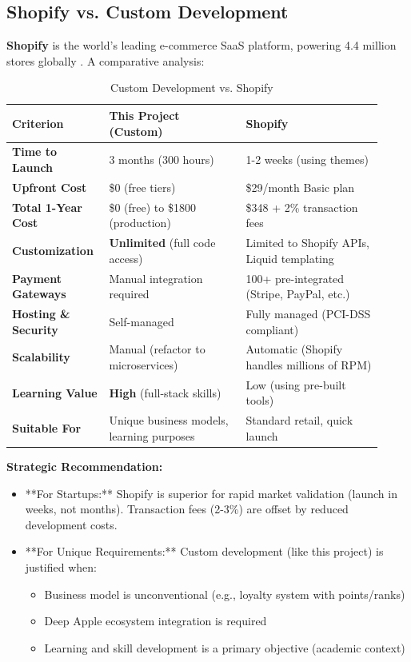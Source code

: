 \documentclass[12pt, a4paper]{report}
\begin{document}
\subsection{Shopify vs. Custom Development}

\textbf{Shopify} is the world's leading e-commerce SaaS platform, powering 4.4 million stores globally \cite{shopify2024}. A comparative analysis:

\begin{table}[H]
\centering
\caption{Custom Development vs. Shopify}
\label{tab:shopify_comparison}
\small
\begin{tabular}{@{}p{0.22\linewidth}p{0.35\linewidth}p{0.35\linewidth}@{}}
\toprule
\textbf{Criterion} & \textbf{This Project (Custom)} & \textbf{Shopify} \\
\midrule
\textbf{Time to Launch} & 3 months (300 hours) & 1-2 weeks (using themes) \\
\textbf{Upfront Cost} & \$0 (free tiers) & \$29/month Basic plan \\
\textbf{Total 1-Year Cost} & \$0 (free) to \$1800 (production) & \$348 + 2\% transaction fees \\
\textbf{Customization} & \textbf{Unlimited} (full code access) & Limited to Shopify APIs, Liquid templating \\
\textbf{Payment Gateways} & Manual integration required & 100+ pre-integrated (Stripe, PayPal, etc.) \\
\textbf{Hosting \& Security} & Self-managed & Fully managed (PCI-DSS compliant) \\
\textbf{Scalability} & Manual (refactor to microservices) & Automatic (Shopify handles millions of RPM) \\
\textbf{Learning Value} & \textbf{High} (full-stack skills) & Low (using pre-built tools) \\
\textbf{Suitable For} & Unique business models, learning purposes & Standard retail, quick launch \\
\bottomrule
\end{tabular}
\end{table}

\textbf{Strategic Recommendation:} 
\begin{itemize}
    \item **For Startups:** Shopify is superior for rapid market validation (launch in weeks, not months). Transaction fees (2-3\%) are offset by reduced development costs.
    \item **For Unique Requirements:** Custom development (like this project) is justified when:
    \begin{itemize}
        \item Business model is unconventional (e.g., loyalty system with points/ranks)
        \item Deep Apple ecosystem integration is required
        \item Learning and skill development is a primary objective (academic context)
    \end{itemize}
\end{itemize}
\end{document}
